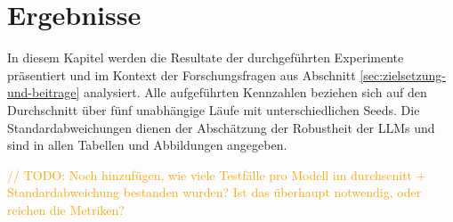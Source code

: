 \chapter{Ergebnisse}\label{ch:ergebnisse}

In diesem Kapitel werden die Resultate der durchgeführten Experimente präsentiert und im Kontext der Forschungsfragen aus Abschnitt \ref{sec:zielsetzung-und-beitrage} analysiert. Alle aufgeführten Kennzahlen beziehen sich auf den Durchschnitt über fünf unabhängige Läufe mit unterschiedlichen Seeds. Die Standardabweichungen dienen der Abschätzung der Robustheit der \acp{LLM} und sind in allen Tabellen und Abbildungen angegeben.

\textcolor{orange}{// TODO: Noch hinzufügen, wie viele Testfälle pro Modell im durchscnitt + Standardabweichung bestanden wurden? Ist das überhaupt notwendig, oder reichen die Metriken?}






